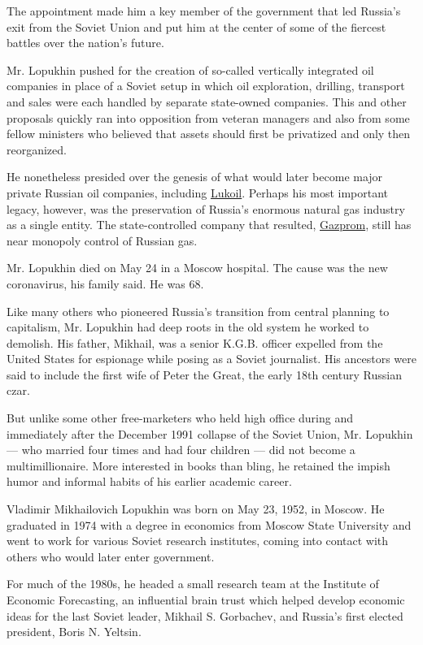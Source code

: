 The appointment made him a key member of the government that led
Russia's exit from the Soviet Union and put him at the center of some of
the fiercest battles over the nation's future.

Mr. Lopukhin pushed for the creation of so-called vertically integrated
oil companies in place of a Soviet setup in which oil exploration,
drilling, transport and sales were each handled by separate state-owned
companies. This and other proposals quickly ran into opposition from
veteran managers and also from some fellow ministers who believed that
assets should first be privatized and only then reorganized.

He nonetheless presided over the genesis of what would later become
major private Russian oil companies, including
\href{https://www.lukoil.com/}{Lukoil}. Perhaps his most important
legacy, however, was the preservation of Russia's enormous natural gas
industry as a single entity. The state-controlled company that resulted,
\href{https://www.gazprom.com/}{Gazprom}, still has near monopoly
control of Russian gas.

Mr. Lopukhin died on May 24 in a Moscow hospital. The cause was the new
coronavirus, his family said. He was 68.

Like many others who pioneered Russia's transition from central planning
to capitalism, Mr. Lopukhin had deep roots in the old system he worked
to demolish. His father, Mikhail, was a senior K.G.B. officer expelled
from the United States for espionage while posing as a Soviet
journalist. His ancestors were said to include the first wife of Peter
the Great, the early 18th century Russian czar.

But unlike some other free-marketers who held high office during and
immediately after the December 1991 collapse of the Soviet Union, Mr.
Lopukhin --- who married four times and had four children --- did not
become a multimillionaire. More interested in books than bling, he
retained the impish humor and informal habits of his earlier academic
career.

Vladimir Mikhailovich Lopukhin was born on May 23, 1952, in Moscow. He
graduated in 1974 with a degree in economics from Moscow State
University and went to work for various Soviet research institutes,
coming into contact with others who would later enter government.

For much of the 1980s, he headed a small research team at the Institute
of Economic Forecasting, an influential brain trust which helped develop
economic ideas for the last Soviet leader, Mikhail S. Gorbachev, and
Russia's first elected president, Boris N. Yeltsin.

